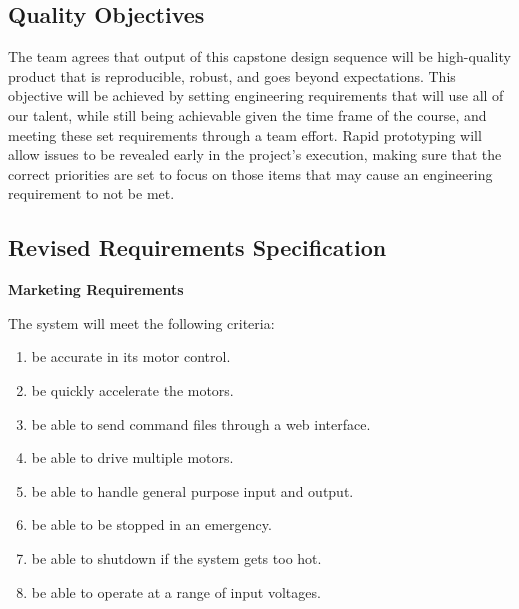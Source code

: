 \subsection{Quality Objectives}
The team agrees that output of this capstone design sequence will be high-quality product that is reproducible, robust, and goes beyond expectations.
This objective will be achieved by setting engineering requirements that will use all of our talent, while still being achievable given the time frame of the course, and meeting these set requirements through a team effort.
Rapid prototyping will allow issues to be revealed early in the project's execution, making sure that the correct priorities are set to focus on those items that may cause an engineering requirement to not be met.

\subsection{Revised Requirements Specification}
\textbf{Marketing Requirements}

The system will meet the following criteria:
\begin{enumerate} \parskip2pt
	
	\item be accurate in its motor control.
	\item be quickly accelerate the motors.
	\item be able to send command files through a web interface.
	\item be able to drive multiple motors.
	\item be able to handle general purpose input and output.
	\item be able to be stopped in an emergency.
	\item be able to shutdown if the system gets too hot. 
	\item be able to operate at a range of input voltages.
\end{enumerate}